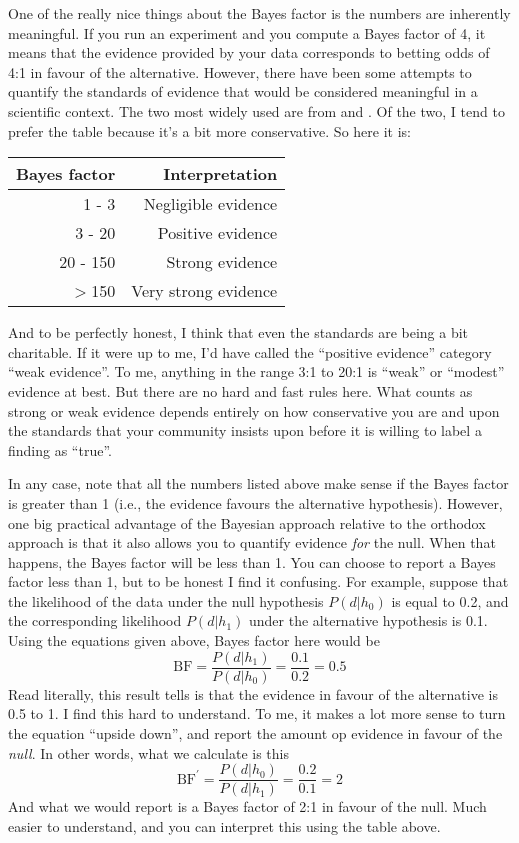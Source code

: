 One of the really nice things about the Bayes factor is the numbers are inherently meaningful. If you run an experiment and you compute a Bayes factor of 4, it means that the evidence provided by your data corresponds to betting odds of 4:1 in favour of the alternative. However, there have been some attempts to quantify the standards of evidence that would be considered meaningful in a scientific context. The two most widely used are from \textcite{Jeffreys1961} and \textcite{Kass1995}. Of the two, I tend to prefer the \textcite{Kass1995} table because it's a bit more conservative. So here it is:
\begin{center}
\begin{tabular}{r|r}
Bayes factor & Interpretation \\ \hline
1 - 3 & Negligible evidence \\
3 - 20 & Positive evidence \\
20 - 150 & Strong evidence \\
$>$150 & Very strong evidence
\end{tabular}
\end{center} 
And to be perfectly honest, I think that even the \textcite{Kass1995} standards are being a bit charitable. If it were up to me, I'd have called the ``positive evidence'' category ``weak evidence''. To me, anything in the range 3:1 to 20:1 is ``weak'' or ``modest'' evidence at best. But there are no hard and fast rules here. What counts as strong or weak evidence depends entirely on how conservative you are and upon the standards that your community insists upon before it is willing to label a finding as ``true''. 

In any case, note that all the numbers listed above make sense if the Bayes factor is greater than 1 (i.e., the evidence favours the alternative hypothesis). However, one big practical advantage of the Bayesian approach relative to the orthodox approach is that it also allows you to quantify evidence {\it for} the null. When that happens, the Bayes factor will be less than 1. You can choose to report a Bayes factor less than 1, but to be honest I find it confusing. For example, suppose that the likelihood of the data under the null hypothesis $P(d|h_0)$ is equal to 0.2, and the corresponding likelihood $P(d|h_1)$ under the alternative hypothesis is 0.1. Using the equations given above,  Bayes factor here would be
$$ 
\mbox{BF} = \frac{P(d|h_1)}{P(d|h_0)} = \frac{0.1}{0.2} = 0.5
$$
Read literally, this result tells is that the evidence in favour of the alternative is 0.5 to 1. I find this hard to understand. To me, it makes  a lot more sense to turn the equation ``upside down'', and report the amount op evidence in favour of the {\it null}. In other words, what we calculate is this
$$ 
\mbox{BF}^\prime = \frac{P(d|h_0)}{P(d|h_1)} = \frac{0.2}{0.1} = 2
$$
And what we would report is a Bayes factor of 2:1 in favour of the null. Much easier to understand, and you can interpret this using the table above. 


